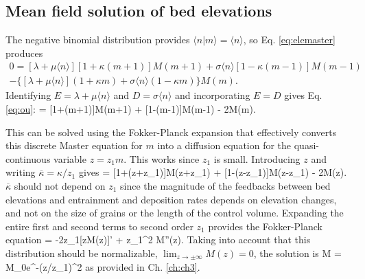 \subsection{Mean field solution of bed elevations}
\label{sec:drr}
The negative binomial distribution provides $\langle n |m \rangle = \langle n \rangle$, so Eq. \ref{eq:elemaster} produces
\begin{multline} 0 = [\lambda + \mu \langle n \rangle][1+\kappa(m+1)]M(m+1) + \sigma \langle n \rangle [1-\kappa(m-1)]M(m-1) \\- \{[\lambda + \mu \langle n \rangle](1+\kappa m) + \sigma \langle n \rangle (1-\kappa m) \}M(m). \end{multline}
Identifying $E=\lambda + \mu \langle n \rangle$ and $D = \sigma \langle n \rangle$ and incorporating $E=D$ gives Eq. \ref{eq:ou}:
 = [1+\kappa(m+1)]M(m+1) + [1-\kappa(m-1)]M(m-1) - 2M(m).\ee

This can be solved using the Fokker-Planck expansion \citep{Gardiner1983} that effectively converts this discrete Master equation for $m$ into a diffusion equation for the quasi-continuous variable $z=z_1 m$. This works since $z_1$ is small. Introducing $z$ and writing $\overline{\kappa}=\kappa/z_1$ gives
 = [1+\overline{\kappa}(z+z_1)]M(z+z_1) + [1-\overline{\kappa}(z-z_1)]M(z-z_1) - 2M(z).\ee
$\overline{\kappa}$ should not depend on $z_1$ since the magnitude of the feedbacks between bed elevations and entrainment and deposition rates depends on elevation changes, and not on the size of grains or the length of the control volume.
Expanding the entire first and second terms to second order $z_1$ provides the Fokker-Planck equation
 = -2\overline{\kappa}z_1[zM(z)]' + z_1^2 M''(z). \ee
Taking into account that this distribution should be normalizable, $\lim_{z\rightarrow \pm \infty}M(z) = 0$, the solution is
\be M = M_0e^{-\kappa (z/z_1)^2}\ee
as provided in Ch. \ref{ch:ch3}.


